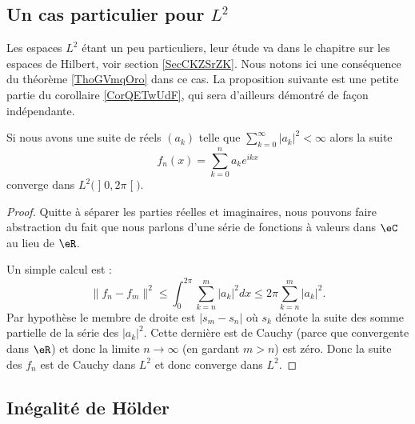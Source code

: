 \subsection{Un cas particulier pour \texorpdfstring{$ L^2$}{ L2}}

Les espaces \( L^2\) étant un peu particuliers, leur étude va dans le chapitre sur les espaces de Hilbert, voir section \ref{SecCKZSrZK}. Nous notons ici une conséquence du théorème \ref{ThoGVmqOro} dans ce cas. La proposition suivante est une petite partie du corollaire \ref{CorQETwUdF}, qui sera d'ailleurs démontré de façon indépendante.

\begin{proposition}
    Si nous avons une suite de réels \( (a_k)\) telle que \( \sum_{k=0}^{\infty}| a_k |^2<\infty\) alors la suite
    \begin{equation}
        f_n(x)=\sum_{k=0}^na_k e^{ikx}
    \end{equation}
    converge dans \( L^2\big( \mathopen] 0 , 2\pi \mathclose[ \big)\).
\end{proposition}

\begin{proof}
    Quitte à séparer les parties réelles et imaginaires, nous pouvons faire abstraction du fait que nous parlons d'une série de fonctions à valeurs dans \( \eC\) au lieu de \( \eR\).

    Un simple calcul est :
    \begin{equation}
        \| f_n-f_m \|^2\leq\int_0^{2\pi}\sum_{k=n}^m| a_k |^2dx\leq 2\pi\sum_{k=n}^m| a_k |^2.
    \end{equation}
    Par hypothèse le membre de droite est \( | s_m-s_n |\) où \( s_k\) dénote la suite des somme partielle de la série des \( | a_k |^2\). Cette dernière est de Cauchy (parce que convergente dans \( \eR\)) et donc la limite \( n\to\infty\) (en gardant \( m>n\)) est zéro. Donc la suite des \( f_n\) est de Cauchy dans \( L^2\) et donc converge dans \( L^2\).
\end{proof}

\subsection{Inégalité de Hölder}

